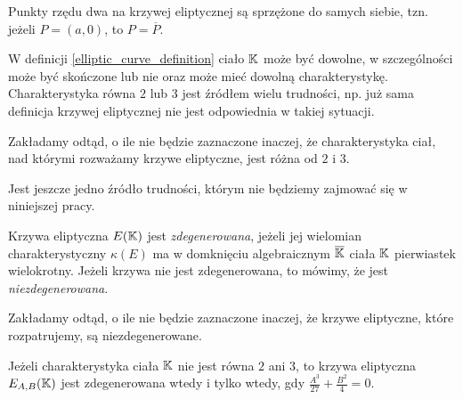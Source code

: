 \begin{fact}
Punkty rzędu dwa na krzywej eliptycznej są sprzężone do samych siebie,
tzn. jeżeli $P = (a, 0)$, to $P = \overline{P}$.
\end{fact}

W definicji \ref{elliptic_curve_definition} ciało $\mathbb{K}$ może być dowolne,
w szczególności może być skończone lub nie
oraz może mieć dowolną charakterystykę.
Charakterystyka równa $2$ lub $3$ jest źródłem wielu trudności,
np. już sama definicja krzywej eliptycznej
nie jest odpowiednia w takiej sytuacji.

\begin{remark}
Zakładamy odtąd, o ile nie będzie zaznaczone inaczej,
że charakterystyka ciał, nad którymi rozważamy krzywe eliptyczne,
jest różna od $2$ i $3$.
\end{remark}

Jest jeszcze jedno źródło trudności,
którym nie będziemy zajmować się w niniejszej pracy.

\begin{definition}
Krzywa eliptyczna $E(\mathbb{K})$ jest \emph{zdegenerowana},
jeżeli jej wielomian charakterystyczny $\kappa(E)$
ma w domknięciu algebraicznym $\overline{\mathbb{K}}$ ciała $\mathbb{K}$
pierwiastek wielokrotny.
Jeżeli krzywa nie jest zdegenerowana,
to mówimy, że jest \emph{niezdegenerowana}.
\end{definition}

\begin{remark}
Zakładamy odtąd, o ile nie będzie zaznaczone inaczej,
że krzywe eliptyczne, które rozpatrujemy,
są niezdegenerowane.
\end{remark}

\begin{theorem}
Jeżeli charakterystyka ciała $\mathbb{K}$ nie jest równa $2$ ani $3$,
to krzywa eliptyczna $E_{A,B}(\mathbb{K})$ jest zdegenerowana wtedy i tylko wtedy,
gdy $\frac{A^3}{27} + \frac{B^2}{4} = 0$.
\end{theorem}
